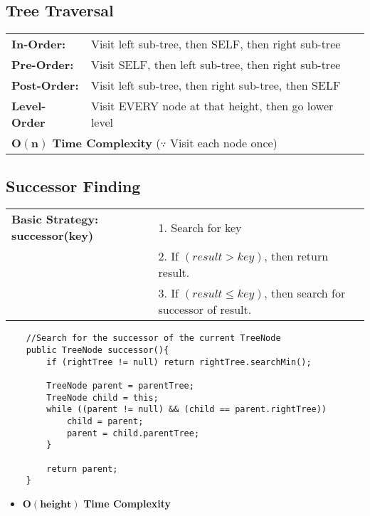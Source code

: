 \documentclass{article}
\begin{document}
    \subsection{Tree Traversal}

    \begin{tabular}{ll}
        \textbf{In-Order:} & Visit left sub-tree, then SELF, then right sub-tree\\
        \textbf{Pre-Order:} & Visit SELF, then left sub-tree, then right sub-tree\\
        \textbf{Post-Order:} & Visit left sub-tree, then right sub-tree, then SELF\\
        \textbf{Level-Order} & Visit EVERY node at that height, then go lower level\\
        \multicolumn{2}{l}{$\bm{O(n)}$ \textbf{Time Complexity} ($\because$ Visit each node once)}\\
    \end{tabular}

    \subsection{Successor Finding}

    \begin{tabular}{ll}
        \textbf{Basic Strategy: successor(key)} & 1. Search for key\\
        &2. If $(result > key)$, then return result.\\
        &3. If $(result \leq key)$, then search for successor
        of result.\\
    \end{tabular}

    \begin{verbatim}
    //Search for the successor of the current TreeNode
    public TreeNode successor(){
        if (rightTree != null) return rightTree.searchMin();

        TreeNode parent = parentTree;
        TreeNode child = this;
        while ((parent != null) && (child == parent.rightTree))
            child = parent;
            parent = child.parentTree;
        }
        
        return parent;
    }
    \end{verbatim}

    \begin{itemize}
        \item $\bm{O(height)}$ \textbf{Time Complexity}
    \end{itemize}
\end{document}
